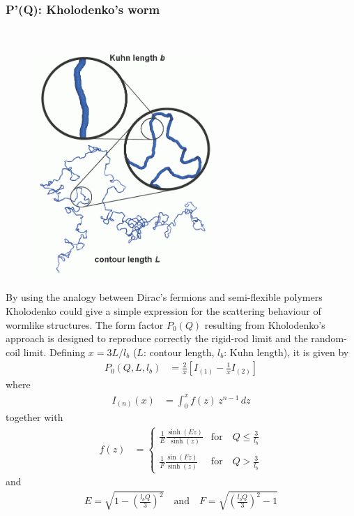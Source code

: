 \clearpage
\subsubsection{P'(Q): Kholodenko's worm} ~\\
\label{plugin:Pprime4kohlodenko}

\begin{figure}[htb]
\begin{center}
\includegraphics[width=0.617\textwidth,height=0.762\textwidth]{SemiflexiblePolymerTxt.png}
\end{center}
\caption{}
\label{fig:Pprime4KholodenkoWorm}
\end{figure}

By using the analogy between Dirac's fermions
and semi-flexible polymers
Kholodenko \cite{kholodenko93} could give a simple expression for the
scattering behaviour of wormlike structures. The form factor $P_0(Q)$ resulting
from Kholodenko's approach is designed to reproduce
correctly the rigid-rod limit and the random-coil limit.
Defining $x = 3L/l_b$ ($L$: contour length, $l_b$: Kuhn length), it is given by
\begin{align}
P_0(Q,L,l_b) &= \frac{2}{x} \left[I_{(1)} -\frac{1}{x}I_{(2)}\right]
\label{eq:KholodenkoPprime}
\end{align}
where
\begin{align}
I_{(n)}(x) &= \int_0^x  f(z) \, z^{n-1} \, dz
\end{align}
together with
\begin{align}
f(z) &=
\begin{cases} \displaystyle
\frac{1}{E}\frac{\sinh(Ez)}{\sinh(z)} & \text{for} \quad \displaystyle Q \leq \frac{3}{l_b}\\ \\
\displaystyle
\frac{1}{F}\frac{\sin(Fz)}{\sinh(z)} & \text{for} \quad \displaystyle Q > \frac{3}{l_b}
\end{cases}
\end{align}
and
\begin{align}
E = \sqrt{1-\left(\frac{l_bQ}{3}\right)^2} \quad \text{and} \quad F = \sqrt{\left(\frac{l_bQ}{3}\right)^2-1}
\end{align}

